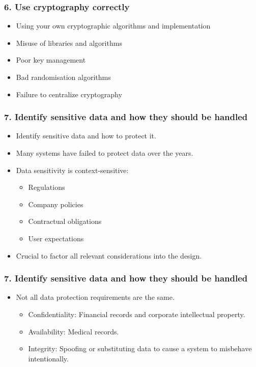 \documentclass[12pt,norsk]{beamer}
\begin{document}
\begin{frame}

	\frametitle{6. Use cryptography correctly}
	
	\begin{itemize}
		
		\item Using your own cryptographic algorithms and implementation
		\item Misuse of libraries and algorithms
		\item Poor key management
		\item Bad randomisation algorithms
		\item Failure to centralize cryptography
	\end{itemize}
\end{frame}

\begin{frame}

	\frametitle{7. Identify sensitive data and how they should be handled}
	\begin{itemize}
		\item Identify sensitive data and how to protect it.
		\item Many systems have failed to protect data over the years.
		\item Data sensitivity is context-sensitive:
		\begin{itemize}
			\item Regulations
			\item Company policies
			\item Contractual obligations
			\item User expectations
		\end{itemize}
		\item Crucial to factor all relevant considerations into the design.
		
	\end{itemize}
	

\end{frame}

\begin{frame}

	\frametitle{7. Identify sensitive data and how they should be handled}
	\begin{itemize}

		\item Not all data protection requirements are the same.
		\begin{itemize}
			\item Confidentiality: Financial records and corporate intellectual property.
			\item Availability: Medical records.
			\item Integrity: Spoofing or substituting data to cause a system to misbehave intentionally.
		\end{itemize}
		
		
	\end{itemize}
	

\end{frame}
\end{document}
